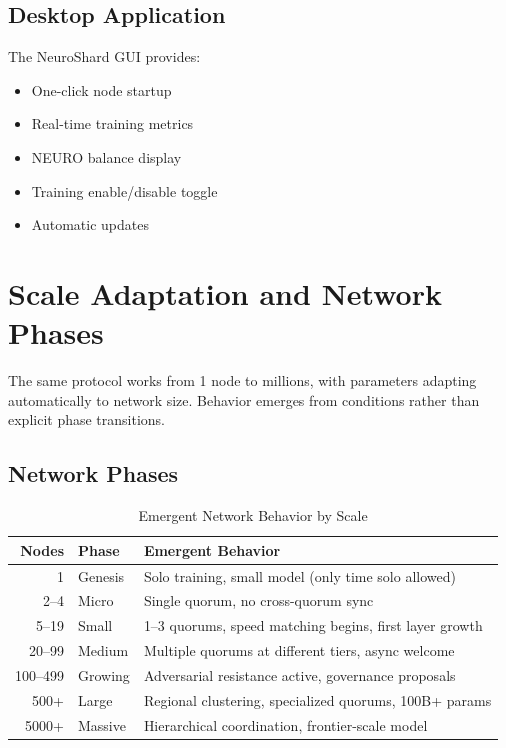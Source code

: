 \documentclass[11pt,a4paper]{article}
\begin{document}
\subsection{Desktop Application}

The NeuroShard GUI provides:
\begin{itemize}
    \item One-click node startup
    \item Real-time training metrics
    \item NEURO balance display
    \item Training enable/disable toggle
    \item Automatic updates
\end{itemize}

\section{Scale Adaptation and Network Phases}

The same protocol works from 1 node to millions, with parameters adapting automatically to network size. Behavior emerges from conditions rather than explicit phase transitions.

\subsection{Network Phases}

\begin{table}[H]
\centering
\caption{Emergent Network Behavior by Scale}
\begin{tabular}{@{}rll@{}}
\toprule
\textbf{Nodes} & \textbf{Phase} & \textbf{Emergent Behavior} \\
\midrule
1 & Genesis & Solo training, small model (only time solo allowed) \\
2--4 & Micro & Single quorum, no cross-quorum sync \\
5--19 & Small & 1--3 quorums, speed matching begins, first layer growth \\
20--99 & Medium & Multiple quorums at different tiers, async welcome \\
100--499 & Growing & Adversarial resistance active, governance proposals \\
500+ & Large & Regional clustering, specialized quorums, 100B+ params \\
5000+ & Massive & Hierarchical coordination, frontier-scale model \\
\bottomrule
\end{tabular}
\end{table}
\end{document}
